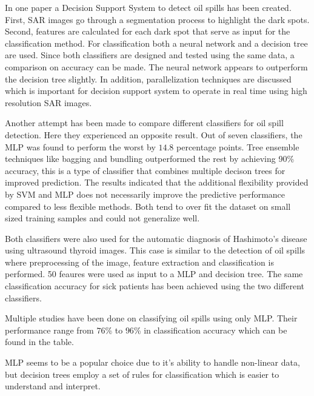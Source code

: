 In one paper a Decision Support System to detect oil spills has been created. First, SAR images go through a segmentation process to highlight the dark spots. Second, features are calculated for each dark spot that serve as input for the classification method.  For classification both a neural network and a decision tree are used. Since both classifiers are designed and tested using the same data, a comparison on accuracy can be made. The neural network appears to outperform the decision tree slightly. In addition, parallelization techniques are discussed which is important for decision support system to operate in real time using high resolution SAR images.\cite{Mera201472}
	
Another attempt has been made to compare different classifiers for oil spill detection.\cite{Xu201414} Here they experienced an opposite result. Out of seven classifiers, the MLP was found to perform the worst by $14.8$ percentage points. Tree ensemble techniques like bagging and bundling outperformed the rest by achieving 90\% accuracy, this is a type of classifier that combines multiple decison trees for improved prediction. The results indicated that the additional flexibility provided by SVM and MLP does not necessarily improve the predictive performance compared to less flexible methods. Both tend to over fit the dataset on small sized training samples and could not generalize well. 
	
Both classifiers were also used for the automatic diagnosis of Hashimoto's disease using ultrasound thyroid images\cite{Omiotek201340}. This case is similar to the detection of oil spills where preprocessing of the image, feature extraction and classification is performed. 50 feaures were used as input to a MLP and decision tree. The same classification accuracy for sick patients has been achieved using the two different classifiers.

Multiple studies\cite{Topouzelis200762}\cite{Delfrate200038}\cite{Topouzelis200930}\cite{Topouzelis200924}\cite{Delfrate2004} have been done on classifying oil spills using only MLP. Their performance range from $76$\% to $96$\% in classification accuracy which can be found in the table. 

MLP seems to be a popular choice due to it's ability to handle non-linear data, but decision trees employ a set of rules for classification which is easier to understand and interpret.






	